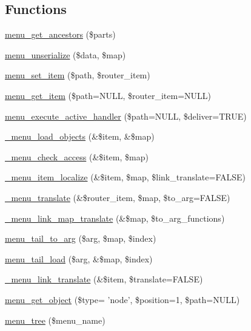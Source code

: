 \subsection*{Functions}
\begin{DoxyCompactItemize}
\item 
\hyperlink{group__menu_ga24ddfa75da5f03482a2df2c9c8d1f711}{menu\_\-get\_\-ancestors} (\$parts)
\item 
\hyperlink{group__menu_ga3f9fe4d53dc9d9c3724f956f1465b5be}{menu\_\-unserialize} (\$data, \$map)
\item 
\hyperlink{group__menu_ga731543157fbe59176d20af2282df5f75}{menu\_\-set\_\-item} (\$path, \$router\_\-item)
\item 
\hyperlink{group__menu_ga855b1ca6ef9e44eb6107a2b9d0f581df}{menu\_\-get\_\-item} (\$path=NULL, \$router\_\-item=NULL)
\item 
\hyperlink{group__menu_gae33bae24fcac6126aa272d1c437f947c}{menu\_\-execute\_\-active\_\-handler} (\$path=NULL, \$deliver=TRUE)
\item 
\hyperlink{group__menu_ga8aeba67f5ade33d997f9869ce3e41fa6}{\_\-menu\_\-load\_\-objects} (\&\$item, \&\$map)
\item 
\hyperlink{group__menu_ga255e3052e7679155b37b82d9bcbe19c9}{\_\-menu\_\-check\_\-access} (\&\$item, \$map)
\item 
\hyperlink{group__menu_ga3b0c0f37db66372ac4e90afa35b191e9}{\_\-menu\_\-item\_\-localize} (\&\$item, \$map, \$link\_\-translate=FALSE)
\item 
\hyperlink{group__menu_ga0e8535f35bcd1a03e71120a2d6ecc099}{\_\-menu\_\-translate} (\&\$router\_\-item, \$map, \$to\_\-arg=FALSE)
\item 
\hyperlink{group__menu_gaac930b7a3cacbf70430c8dc3aa884198}{\_\-menu\_\-link\_\-map\_\-translate} (\&\$map, \$to\_\-arg\_\-functions)
\item 
\hyperlink{group__menu_gaad6215c5bf31dffe08a2b75e66345d10}{menu\_\-tail\_\-to\_\-arg} (\$arg, \$map, \$index)
\item 
\hyperlink{group__menu_ga6ed894e4c0813549a74b46c5a62e1c25}{menu\_\-tail\_\-load} (\$arg, \&\$map, \$index)
\item 
\hyperlink{group__menu_ga75bf09f752589011fc9256b041cf7cc0}{\_\-menu\_\-link\_\-translate} (\&\$item, \$translate=FALSE)
\item 
\hyperlink{group__menu_ga8b1c8825ae7b6ae31b50cadaa1f7c920}{menu\_\-get\_\-object} (\$type= 'node', \$position=1, \$path=NULL)
\item 
\hyperlink{group__menu_ga91022785ee027528b5cee2faff31f62f}{menu\_\-tree} (\$menu\_\-name)

\end{DoxyCompactItemize}
